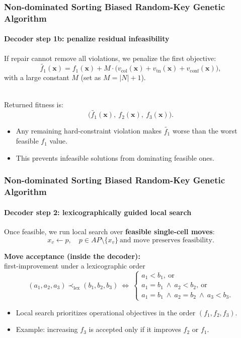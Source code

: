 \documentclass[
	11pt, %
	aspectratio=169, %
]{beamer}
\begin{document}
\begin{frame}
\frametitle{Non-dominated Sorting Biased Random-Key Genetic Algorithm}
\framesubtitle{Decoder step 1b: penalize residual infeasibility}

If repair cannot remove all violations, we penalize the first objective:
\[
\tilde{f_{1}}(\mathbf{x}) = f_{1}(\mathbf{x}) + M\cdot\big(v_{\mathrm{col}}(\mathbf{x}) + v_{\mathrm{tn}}(\mathbf{x}) + v_{\mathrm{conf}}(\mathbf{x})\big),
\]
with a large constant $M$ (set as $M = |N| + 1$).

~\\

Returned fitness is:
\[
\big(\tilde{f_{1}}(\mathbf{x}),\ f_{2}(\mathbf{x}),\ f_{3}(\mathbf{x})\big).
\]

\begin{itemize}
\item Any remaining hard-constraint violation makes $\tilde{f_{1}}$ worse than the worst feasible $f_{1}$ value.
\item This prevents infeasible solutions from dominating feasible ones.
\end{itemize}

\end{frame}

\begin{frame}
\frametitle{Non-dominated Sorting Biased Random-Key Genetic Algorithm}
\framesubtitle{Decoder step 2: lexicographically guided local search}

Once feasible, we run local search over \textbf{feasible single-cell moves}:
\[
x_{v} \leftarrow p, \quad p \in AP \setminus \{x_{v}\}\ \text{and move preserves feasibility.}
\]

\textbf{Move acceptance (inside the decoder):} \\
first-improvement under a lexicographic order
\[
(a_{1}, a_{2}, a_{3}) \prec_{\text{lex}} (b_{1}, b_{2}, b_{3})\ \Leftrightarrow\ 
\begin{cases}
a_{1} < b_{1},\ \text{or}\\
a_{1} = b_{1}\ \wedge\ a_{2} < b_{2},\ \text{or}\\
a_{1} = b_{1}\ \wedge\ a_{2} = b_{2}\ \wedge\ a_{3} < b_{3}.
\end{cases}
\]

\begin{itemize}
\item Local search prioritizes operational objectives in the order $(f_{1}, f_{2}, f_{3})$.
\item Example: increasing $f_{3}$ is accepted only if it improves $f_{2}$ or $f_{1}$.
\end{itemize}

\end{frame}
\end{document}
